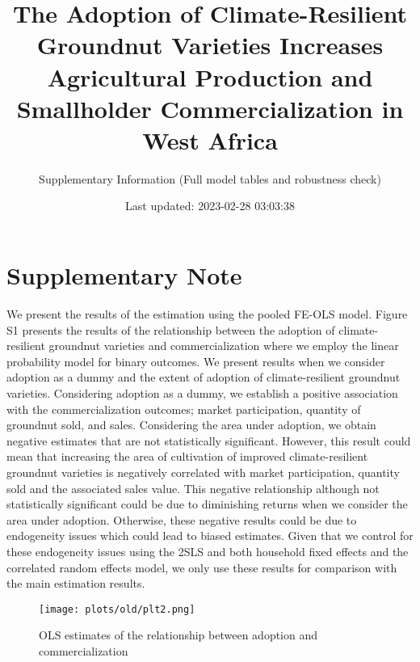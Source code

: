 \documentclass[
]{article}
\title{The Adoption of Climate-Resilient Groundnut Varieties Increases Agricultural Production and Smallholder Commercialization in West Africa}
\subtitle{Supplementary Information (Full model tables and robustness check)}
\date{Last updated: 2023-02-28 03:03:38}
\begin{document}
\maketitle

\newpage
\tableofcontents
\newpage
\listoftables
\newpage

\newpage

\newpage

\hypertarget{supplementary-note}{%
\section{Supplementary Note}\label{supplementary-note}}

We present the results of the estimation using the pooled FE-OLS model. Figure S1 presents the results of the relationship between the adoption of climate-resilient groundnut varieties and commercialization where we employ the linear probability model for binary outcomes. We present results when we consider adoption as a dummy and the extent of adoption of climate-resilient groundnut varieties. Considering adoption as a dummy, we establish a positive association with the commercialization outcomes; market participation, quantity of groundnut sold, and sales. Considering the area under adoption, we obtain negative estimates that are not statistically significant. However, this result could mean that increasing the area of cultivation of improved climate-resilient groundnut varieties is negatively correlated with market participation, quantity sold and the associated sales value. This negative relationship although not statistically significant could be due to diminishing returns when we consider the area under adoption. Otherwise, these negative results could be due to endogeneity issues which could lead to biased estimates. Given that we control for these endogeneity issues using the 2SLS and both household fixed effects and the correlated random effects model, we only use these results for comparison with the main estimation results.

\begin{figure}[htbp]
\centering
\texttt{[image: plots/old/plt2.png]}
\caption{OLS estimates of the relationship between adoption and commercialization}
\end{figure}
\end{document}
